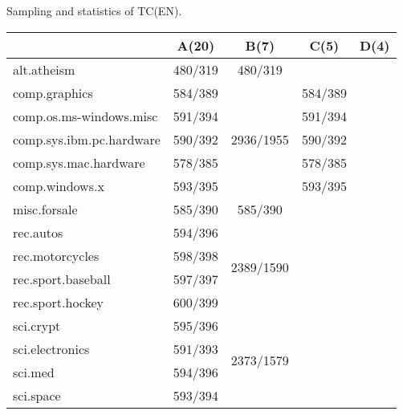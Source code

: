 \centering
\caption{Sampling and statistics of TC(EN).}
\begin{tabular}{|l|c|c|c|c|}
\hline
                         & A(20)      & B(7)                       & C(5)      & D(4)      \\ \hline
alt.atheism              & 480/319    & 480/319                    &           &           \\ \hline
comp.graphics            & 584/389    & \multirow{5}{*}{2936/1955} & 584/389   &           \\ \cline{1-2} \cline{4-5} 
comp.os.ms-windows.misc  & 591/394    &                            & 591/394   &           \\ \cline{1-2} \cline{4-5} 
comp.sys.ibm.pc.hardware & 590/392    &                            & 590/392   &           \\ \cline{1-2} \cline{4-5} 
comp.sys.mac.hardware    & 578/385    &                            & 578/385   &           \\ \cline{1-2} \cline{4-5} 
comp.windows.x           & 593/395    &                            & 593/395   &           \\ \hline
misc.forsale             & 585/390    & 585/390                    &           &           \\ \hline
rec.autos                & 594/396    & \multirow{4}{*}{2389/1590} &           &           \\ \cline{1-2} \cline{4-5} 
rec.motorcycles          & 598/398    &                            &           &           \\ \cline{1-2} \cline{4-5} 
rec.sport.baseball       & 597/397    &                            &           &           \\ \cline{1-2} \cline{4-5} 
rec.sport.hockey         & 600/399    &                            &           &           \\ \hline
sci.crypt                & 595/396    & \multirow{4}{*}{2373/1579} &           &           \\ \cline{1-2} \cline{4-5} 
sci.electronics          & 591/393    &                            &           &           \\ \cline{1-2} \cline{4-5} 
sci.med                  & 594/396    &                            &           &           \\ \cline{1-2} \cline{4-5} 
sci.space                & 593/394    &                            &           &           \\ \hline

\end{tabular}
